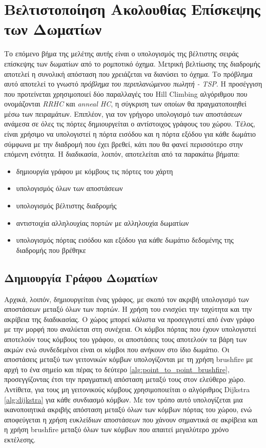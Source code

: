\section{Βελτιστοποίηση Ακολουθίας Επίσκεψης των Δωματίων}
\label{section:room_sequence_implementation}

Tο επόμενο βήμα της μελέτης αυτής είναι ο υπολογισμός της βέλτιστης σειράς επίσκεψης των δωματίων από το ρομποτικό όχημα. Μετρική βελτίωσης της διαδρομής αποτελεί η συνολική απόσταση που χρειάζεται να διανύσει το όχημα. Το πρόβλημα αυτό αποτελεί το γνωστό \emph{πρόβλημα του περιπλανώμενου πωλητή - TSP}. Η προσέγγιση που προτείνεται χρησιμοποιεί δύο παραλλαγές του Hill Climbing αλγόριθμου που ονομάζονται \emph{RRHC} και \emph{anneal HC}, η σύγκριση των οποίων θα πραγματοποιηθεί μέσω των πειραμάτων. Επιπλέον, για τον γρήγορο υπολογισμό των αποστάσεων ανάμεσα σε όλες τις πόρτες δημιουργείται ο αντίστοιχος γράφους του χώρου. Τέλος, είναι χρήσιμο να υπολογιστεί η πόρτα εισόδου και η πόρτα εξόδου για κάθε δωμάτιο σύμφωνα με την διαδρομή που έχει βρεθεί, κάτι που θα φανεί περισσότερο στην επόμενη ενότητα. Η διαδικασία, λοιπόν, αποτελείται από τα παρακάτω βήματα:

\begin{itemize}
    \setlength\itemsep{-0.2em}
    \item δημιουργία γράφου με κόμβους τις πόρτες του χάρτη
    \item υπολογισμός όλων των αποστάσεων
    \item υπολογισμός βέλτιστης διαδρομής
    \item αντιστοιχία αλληλουχίας πορτών με αλληλουχία δωματίων
    \item υπολογισμός πόρτας εισόδου και εξόδου για κάθε δωμάτιο δεδομένης της διαδρομής που βρέθηκε
\end{itemize}


\subsection{Δημιουργία Γράφου Δωματίων}
\label{subsection:room_graph}

Αρχικά, λοιπόν, δημιουργείται ένας γράφος, με σκοπό τον ακριβή υπολογισμό των αποστάσεων μεταξύ όλων των πορτών. Η χρήση του ενισχύει την ταχύτητα και την ακρίβεια της διαδικασίας. Ο χώρος μπορεί κάλιστα να προσεγγιστεί από έναν γράφο με την μορφή που αναλύεται στη συνέχεια. Οι κόμβοι πόρτας που έχουν υπολογιστεί αποτελούν τους κόμβους του γράφου, οι αποστάσεις τους αποτελούν τα βάρη των ακμών ενώ συνδεδεμένοι είναι οι κόμβοι που ανήκουν στο ίδιο δωμάτιο. Οι αποστάσεις μεταξύ των γειτονικών κόμβων υπολογίζονται με τη χρήση brushfire με αρχή το ένα σημείο και πέρας το δεύτερο \ref{alg:point_to_point_brushfire}, προσεγγίζοντας έτσι την πραγματική απόσταση μεταξύ τους στον ελεύθερο χώρο. Αντίθετα, για τους μη γειτονικούς κόμβους χρησιμοποιείται ο αλγόριθμος Dijkstra \ref{alg:dijkstra} για κάθε συνδιασμό κόμβων. Με τον τρόπο αυτό υπολογίζεται μια ικανοποιητικά ακριβής απόσταση μεταξύ όλων των κόμβων πόρτας του χώρου, ενώ αποφεύγεται η χρήση ευκλείδιων αποστάσεων που χάνουν σημαντικά σε ακρίβεια και η χρήση brushfire μεταξύ όλων των κόμβων που απαιτεί μεγαλύτερο χρόνο εκτέλεσης.



